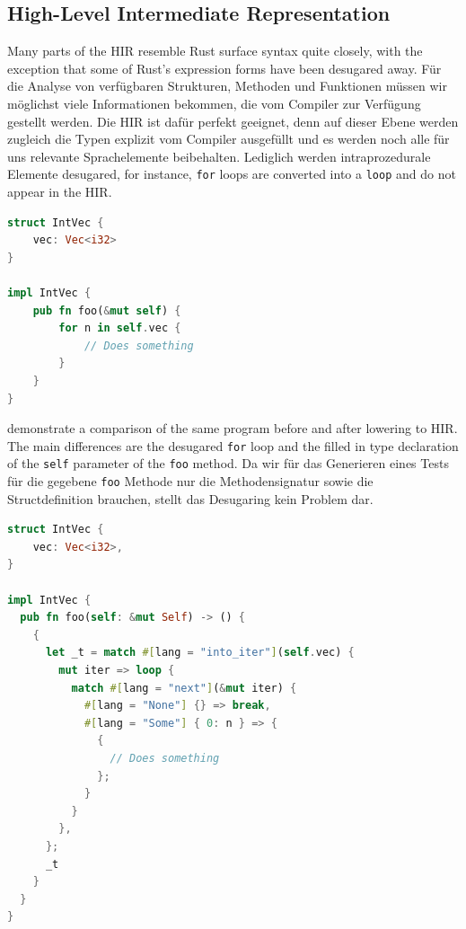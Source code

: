 \documentclass[paper=a4,%
  twoside,%
  BCOR4mm,%
  abstract=true,%
  toc=bibliography,%
  chapterprefix=true,%
  toc=bibliographynumbered,%
  open=right,%
  english,%
  pagesize=pdftex]{scrreprt}
\begin{document}
\subsection{High-Level Intermediate Representation}
Many parts of the \ac{HIR} resemble Rust surface syntax quite closely, with the exception that some of Rust's expression forms have been desugared away. Für die Analyse von verfügbaren Strukturen, Methoden und Funktionen müssen wir möglichst viele Informationen bekommen, die vom Compiler zur Verfügung gestellt werden. Die \ac{HIR} ist dafür perfekt geeignet, denn auf dieser Ebene werden zugleich die Typen explizit vom Compiler ausgefüllt und es werden noch alle für uns relevante Sprachelemente beibehalten. Lediglich werden intraprozedurale Elemente desugared, for instance, \lstinline{for} loops are converted into a \lstinline{loop} and do not appear in the \ac{HIR}.
\begin{lstlisting}[language=Rust, style=boxed, caption={An example Rust program that we convert to HIR}, label=lst:hir-lowering]
struct IntVec {
    vec: Vec<i32>
}

impl IntVec {
    pub fn foo(&mut self) {
        for n in self.vec {
            // Does something
        }
    }
}
\end{lstlisting}

 demonstrate a comparison of the same program before and after lowering to \ac{HIR}. The main differences are the desugared \lstinline{for} loop and the filled in type declaration of the \lstinline{self} parameter of the \lstinline{foo} method. Da wir für das Generieren eines Tests für die gegebene \lstinline{foo} Methode nur die Methodensignatur sowie die Structdefinition brauchen, stellt das Desugaring kein Problem dar.

\begin{lstlisting}[language=Rust, style=boxed, caption={HIR of the code in \Cref{lst:hir-lowering}}, label=lst:hir-lowered]
struct IntVec {
    vec: Vec<i32>,
}

impl IntVec {
  pub fn foo(self: &mut Self) -> () {
    {
      let _t = match #[lang = "into_iter"](self.vec) {
        mut iter => loop {
          match #[lang = "next"](&mut iter) {
            #[lang = "None"] {} => break,
            #[lang = "Some"] { 0: n } => {
              {
                // Does something
              };
            }
          }
        },
      };
      _t
    }
  }
}
\end{lstlisting}
\end{document}
